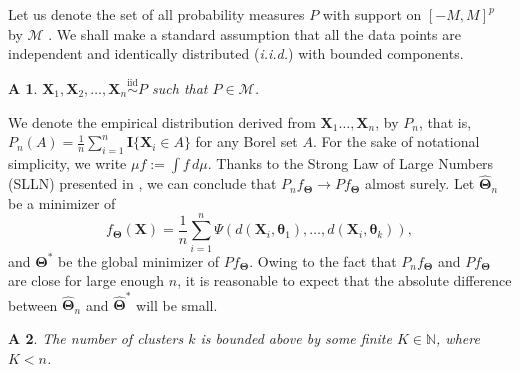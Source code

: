 \documentclass{article}
\newcommand{\bX}{\boldsymbol{X}}
\newcommand{\bTheta}{\boldsymbol{\Theta}}
\newtheorem{assumption}{A\hspace{-2pt}}
\begin{document}




Let us denote the set of all probability measures $P$ with support on $[-M,M]^p$ by $\mathcal{M}$%
. We shall make a standard assumption that all the data points are independent and identically distributed (\textit{i.i.d.}) with bounded components.

\begin{assumption}\label{ass-1-iid}
    $\bm{X}_1,\bm{X}_2,\ldots,\bm{X}_n \overset{\text{iid}}{\sim}P$ such that $P\in \mathcal{M}$.
\end{assumption}

We denote the empirical distribution derived from $\bX_1\ldots,\bX_n$, by $P_n$, that is, $P_n(A) = \frac{1}{n}\sum_{i=1}^n \mathbf{I}\{\bX_i \in A\}$ for any Borel set $A$. 
For the sake of notational simplicity, we write $\mu f := \int f \, d\mu$. Thanks to the Strong Law of Large Numbers (SLLN) presented in \citep{athreya2006measure}, we can conclude that $P_n f_{\bTheta} \rightarrow Pf_{\bTheta}$ almost surely. Let $\widehat{\bm{\Theta}}_n$ be a minimizer of \[f_{\bm\Theta}(\bm{X})=\frac{1}{n} \sum_{i=1}^n \Psi(d(\bm{X}_i, \bm{\theta}_1), \ldots, d(\bm{X}_i, \bm{\theta}_k)),\]
and $\bm{\Theta}^*$ be the global minimizer of $Pf_{\bm{\Theta}}$. 
Owing to the fact that $P_n f_{\bm{\Theta}}$ and $P f_{\bTheta}$ are close for large enough $n$, it is reasonable to expect that the absolute difference between $\widehat{\bm{\Theta}}_n$ and $\bm{\widehat{\Theta}}^*$ will be small. %

\begin{assumption}\label{ass-2-cluster-count}
    The number of clusters $k$ is bounded above by some finite $K\in \mathbb{N}$, where $K < n$.
\end{assumption}
\end{document}
